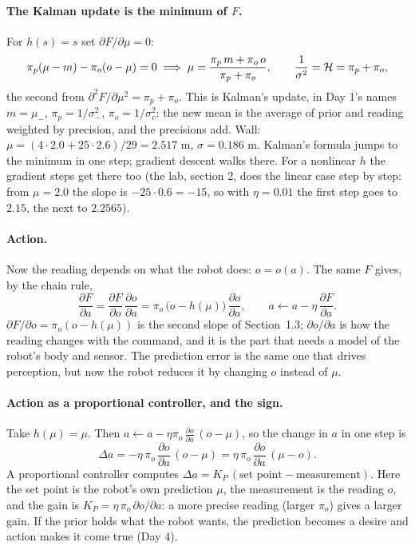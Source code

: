 \documentclass[11pt]{article}
\begin{document}
\paragraph{The Kalman update is the minimum of $F$.} For $h(s) = s$ set $\partial F/\partial\mu = 0$:
\[
\pi_p(\mu - m) - \pi_o(o-\mu) = 0 \;\Longrightarrow\; \mu = \frac{\pi_p\,m + \pi_o\,o}{\pi_p + \pi_o},\qquad \frac{1}{\sigma^2} = \mathcal{H} = \pi_p + \pi_o,
\]
the second from $\partial^2F/\partial\mu^2 = \pi_p+\pi_o$. This is Kalman's update, in Day 1's names $m = \mu_-$, $\pi_p = 1/\sigma_-^2$, $\pi_o = 1/\sigma_v^2$: the new mean is the average of prior and reading weighted by precision, and the precisions add. Wall: $\mu = (4\cdot2.0 + 25\cdot2.6)/29 = 2.517$ m, $\sigma = 0.186$ m. Kalman's formula jumps to the minimum in one step; gradient descent walks there. For a nonlinear $h$ the gradient steps get there too (the lab, section 2, does the linear case step by step: from $\mu = 2.0$ the slope is $-25\cdot0.6 = -15$, so with $\eta = 0.01$ the first step goes to $2.15$, the next to $2.2565$).

\paragraph{Action.} Now the reading depends on what the robot does: $o = o(a)$. The same $F$ gives, by the chain rule,
\[
\frac{\partial F}{\partial a} = \frac{\partial F}{\partial o}\,\frac{\partial o}{\partial a} = \pi_o\,\big(o - h(\mu)\big)\,\frac{\partial o}{\partial a},\qquad a\leftarrow a - \eta\,\frac{\partial F}{\partial a}.
\]
$\partial F/\partial o = \pi_o(o - h(\mu))$ is the second slope of Section~1.3; $\partial o/\partial a$ is how the reading changes with the command, and it is the part that needs a model of the robot's body and sensor. The prediction error is the same one that drives perception, but now the robot reduces it by changing $o$ instead of $\mu$.

\paragraph{Action as a proportional controller, and the sign.} Take $h(\mu)=\mu$. Then $a\leftarrow a - \eta\pi_o\,\frac{\partial o}{\partial a}\,(o - \mu)$, so the change in $a$ in one step is
\[
\Delta a = -\eta\,\pi_o\,\frac{\partial o}{\partial a}\,(o-\mu) = \eta\,\pi_o\,\frac{\partial o}{\partial a}\,(\mu - o).
\]
A proportional controller computes $\Delta a = K_P\,(\text{set point} - \text{measurement})$. Here the set point is the robot's own prediction $\mu$, the measurement is the reading $o$, and the gain is $K_P = \eta\,\pi_o\,\partial o/\partial a$: a more precise reading (larger $\pi_o$) gives a larger gain. If the prior holds what the robot wants, the prediction becomes a desire and action makes it come true (Day 4).
\end{document}
